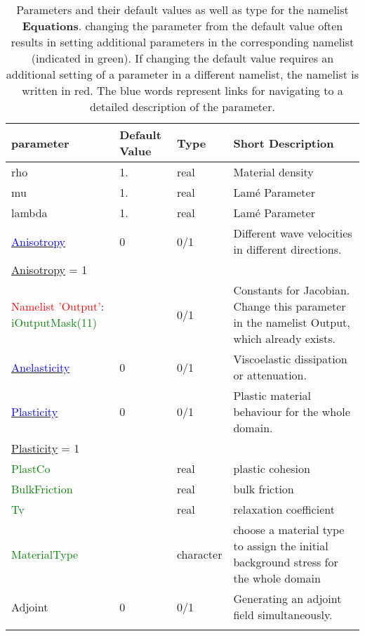 \documentclass[12pt,twoside]{article}
\begin{document}
\begin{longtable}{|p{3cm}|p{2.4cm}|p{2cm}|p{5cm}|}%
\caption{Parameters and their default values as well as type for the namelist \textbf{Equations}.
         changing the parameter from the default value often results in setting additional parameters in the corresponding namelist
         (indicated in green).
         If changing the default value requires an additional setting of a parameter in a different namelist,
         the namelist is written in red. The blue words represent
         links for navigating to a detailed description of the parameter.} \\
\hline
parameter & Default Value & Type & Short Description \\
\hline
\hline
rho   & 1. & real &  Material density \\
mu    & 1. & real & Lam\' e Parameter \\
lambda   & 1. & real & Lam\' e Parameter \\
\hline
\hyperlink{aniso}{\textcolor{blue}{Anisotropy}} & 0 & 0/1  & Different wave velocities in different directions.\\
\hdashline
\uline{Anisotropy} = 1 & & &\\
\textcolor{red}{Namelist 'Output'}: \textcolor{green}{iOutputMask(11)} & & 0/1 & Constants for Jacobian. Change this parameter in the namelist Output, which already exists.\\
\hline
\hyperlink{anelas}{\textcolor{blue}{Anelasticity}} & 0 & 0/1 & Viscoelastic dissipation or attenuation.\\
\hline
\hyperlink{plast}{\textcolor{blue}{Plasticity}} & 0 & 0/1 & Plastic material behaviour for the whole domain.\\
\hdashline
\uline{Plasticity} = 1 & & &\\
\textcolor{green} {PlastCo} & & real & plastic cohesion \\
\textcolor{green} {BulkFriction} & & real & bulk friction \\
\textcolor{green} {Tv} & & real & relaxation coefficient \\
\textcolor{green}{MaterialType} & & character & choose a material type to assign the initial background stress for the whole domain \\
\hline
Adjoint & 0 & 0/1  & Generating an adjoint field simultaneously.\\
\hdashline

\end{longtable}
\end{document}
